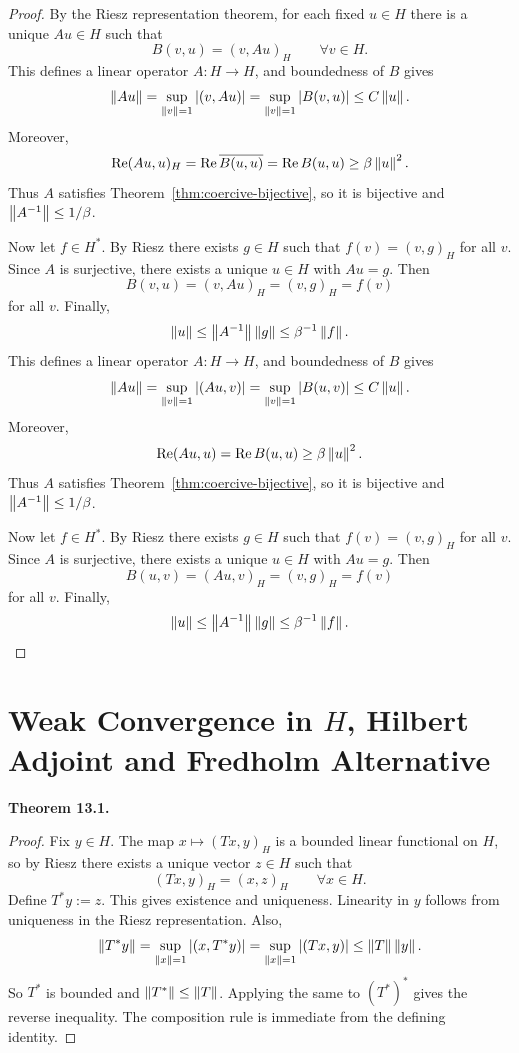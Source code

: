 \documentclass[11pt]{article}
\newenvironment{theoremstmt}[1]{%
  \par\medskip\noindent\textbf{Theorem #1. }\itshape
}{\par\medskip}
\begin{document}
\begin{proof}
By the Riesz representation theorem, for each fixed $u\in H$ there is a unique $Au\in H$ such that
\[
B(v,u)=(v,Au)_H \qquad \forall v\in H.
\]
This defines a linear operator $A:H\to H$, and boundedness of $B$ gives
\[
\left\lVert Au\right\rVert=\sup_{\left\lVert v\right\rVert=1}\left\lvert (v,Au)\right\rvert=
\sup_{\left\lVert v\right\rVert=1}\left\lvert B(v,u)\right\rvert\le C\left\lVert u\right\rVert.
\]
Moreover,
\[
\operatorname{Re}(Au,u)_H=\operatorname{Re}\overline{B(u,u)}=\operatorname{Re}B(u,u)\ge \beta\left\lVert u\right\rVert^2.
\]
Thus $A$ satisfies Theorem~\ref{thm:coercive-bijective}, so it is bijective and $\left\lVert A^{-1}\right\rVert\le 1/\beta$.

Now let $f\in H^*$. By Riesz there exists $g\in H$ such that $f(v)=(v,g)_H$ for all $v$. Since $A$ is surjective, there exists a unique $u\in H$ with $Au=g$. Then
\[
B(v,u)=(v,Au)_H=(v,g)_H=f(v)
\]
for all $v$. Finally,
\[
\left\lVert u\right\rVert\le \left\lVert A^{-1}\right\rVert\left\lVert g\right\rVert\le \beta^{-1}\left\lVert f\right\rVert.
\]
This defines a linear operator $A:H\to H$, and boundedness of $B$ gives
\[
\left\lVert Au\right\rVert=\sup_{\left\lVert v\right\rVert=1}\left\lvert (Au,v)\right\rvert=
\sup_{\left\lVert v\right\rVert=1}\left\lvert B(u,v)\right\rvert\le C\left\lVert u\right\rVert.
\]
Moreover,
\[
\operatorname{Re}(Au,u)=\operatorname{Re}B(u,u)\ge \beta\left\lVert u\right\rVert^2.
\]
Thus $A$ satisfies Theorem~\ref{thm:coercive-bijective}, so it is bijective and $\left\lVert A^{-1}\right\rVert\le 1/\beta$.

Now let $f\in H^*$. By Riesz there exists $g\in H$ such that $f(v)=(v,g)_H$ for all $v$. Since $A$ is surjective, there exists a unique $u\in H$ with $Au=g$. Then
\[
B(u,v)=(Au,v)_H=(v,g)_H=f(v)
\]
for all $v$. Finally,
\[
\left\lVert u\right\rVert\le \left\lVert A^{-1}\right\rVert\left\lVert g\right\rVert\le \beta^{-1}\left\lVert f\right\rVert.
\]
\end{proof}

\section{Weak Convergence in \texorpdfstring{$H$}{H}, Hilbert Adjoint and Fredholm Alternative}

\begin{theoremstmt}{13.1}
\thmHilbertAdjoint
\end{theoremstmt}

\begin{proof}
Fix $y\in H$. The map $x\mapsto (Tx,y)_H$ is a bounded linear functional on $H$, so by Riesz there exists a unique vector $z\in H$ such that
\[
(Tx,y)_H=(x,z)_H \qquad \forall x\in H.
\]
Define $T^*y:=z$. This gives existence and uniqueness. Linearity in $y$ follows from uniqueness in the Riesz representation. Also,
\[
\left\lVert T^*y\right\rVert=
\sup_{\left\lVert x\right\rVert=1}\left\lvert (x,T^*y)\right\rvert=
\sup_{\left\lVert x\right\rVert=1}\left\lvert (Tx,y)\right\rvert
\le \left\lVert T\right\rVert\left\lVert y\right\rVert.
\]
So $T^*$ is bounded and $\left\lVert T^*\right\rVert\le \left\lVert T\right\rVert$. Applying the same to $(T^*)^*$ gives the reverse inequality. The composition rule is immediate from the defining identity.
\end{proof}
\end{document}
